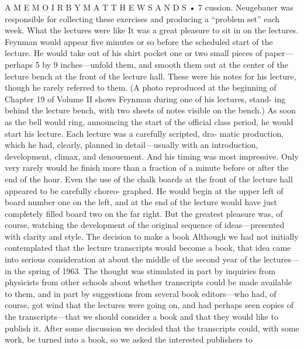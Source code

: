 \documentclass[11pt,oneside]{article}
\begin{document}
A  M E M O I R  B Y  M A T T H E W  S A N D S • 7 cussion. Neugebauer was responsible for collecting these exercises and producing a “problem set” each week. What the lectures were like It was a great pleasure to sit in on the lectures. Feynman would appear five minutes or so before the scheduled start of the lecture. He would take out of his shirt pocket one or two small pieces of paper---perhaps 5 by 9 inches---unfold them, and smooth them out at the center of the lecture bench at the front of the lecture hall. These were his notes for his lecture, though he rarely referred to them. (A photo reproduced at the beginning of Chapter 19 of Volume II shows Feynman during one of his lectures, stand- ing behind the lecture bench, with two sheets of notes visible on the bench.) As soon as the bell would ring, announcing the start of the official class period, he would start his lecture. Each lecture was a carefully scripted, dra- matic production, which he had, clearly, planned in detail---usually with an introduction, development, climax, and denouement. And his timing was most impressive. Only very rarely would he finish more than a fraction of a minute before or after the end of the hour. Even the use of the chalk boards at the front of the lecture hall appeared to be carefully choreo- graphed. He would begin at the upper left of board number one on the left, and at the end of the lecture would have just completely filled board two on the far right. But the greatest pleasure was, of course, watching the development of the original sequence of ideas---presented with clarity and style. The decision to make a book Although we had not initially contemplated that the lecture transcripts would become a book, that idea came into serious consideration at about the middle of the second year of the lectures---in the spring of 1963. The thought was stimulated in part by inquiries from physicists from other schools about whether transcripts could be made available to them, and in part by suggestions from several book editors---who had, of course, got wind that the lectures were going on, and had perhaps seen copies of the transcripts---that we should consider a book and that they would like to publish it. After some discussion we decided that the transcripts could, with some work, be turned into a book, so we asked the interested publishers to\par
\end{document}
